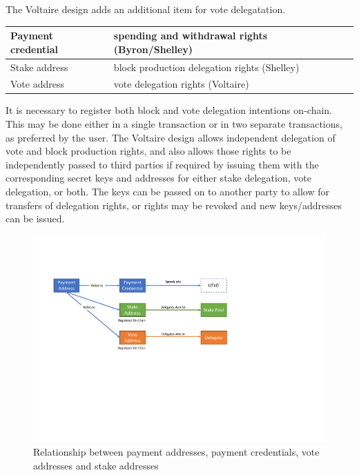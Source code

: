 The Voltaire design adds an additional item for vote delegatation.

\begin{center}
  \begin{tabular}{||l|l||}
  \hline\hline
  Payment credential & spending and withdrawal rights (Byron/Shelley) \\\hline
  Stake address & block production delegation rights (Shelley) \\\hline
  Vote address & vote delegation rights (Voltaire) \\\hline
  \hline
\end{tabular}
\end{center}

It is necessary to register both block and vote delegation intentions on-chain.  This may be done either in a single transaction or in two separate transactions,
as preferred by the user.  The Voltaire design allows independent delegation of vote and block production rights,
and also allows those rights to be independently passed to third parties if required by issuing them with the corresponding secret keys and addresses for either stake delegation, vote delegation, or both.
The keys can be passed on to another party to allow for transfers of delegation rights, or rights may be revoked and new keys/addresses can be issued.

\begin{figure}[h]
  \begin{center}
  \includegraphics[trim=0 250 150 80,clip,width=\textwidth]{Indirection}
  \end{center}
  \caption{Relationship between payment addresses, payment credentials, vote addresses and stake addresses}
  \label{fig:indirection}
\end{figure}

